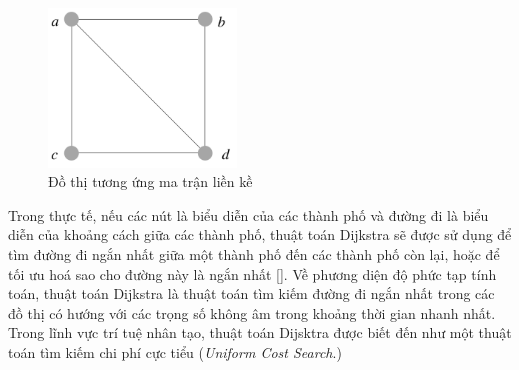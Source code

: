 \documentclass[a4paper]{article}
\begin{document}
\begin{figure}[!ht]
    \centering
    \includegraphics[width=5cm]{graph.png}
    \caption{Đồ thị tương ứng ma trận liền kề}
    \label{fig:graph}
\end{figure}

Trong thực tế, nếu các nút là biểu diễn của các thành phố và đường đi là biểu diễn của khoảng cách giữa các thành phố, thuật toán Dijkstra sẽ được sử dụng để tìm đường đi ngắn nhất giữa một thành phố đến các thành phố còn lại, hoặc để tối ưu hoá sao cho đường này là ngắn nhất [\cite{schulz2000dijkstra, chen2014path, deng2012fuzzy, makariye2017towards, bozyiugit2017public, lanning2014dijkstra}]. Về phương diện độ phức tạp tính toán, thuật toán Dijkstra là thuật toán tìm kiếm đường đi ngắn nhất trong các đồ thị có hướng với các trọng số không âm trong khoảng thời gian nhanh nhất. Trong lĩnh vực trí tuệ nhân tạo, thuật toán Dijsktra được biết đến như một thuật toán tìm kiếm chi phí cực tiểu (\textit{Uniform Cost Search}.)
\end{document}
